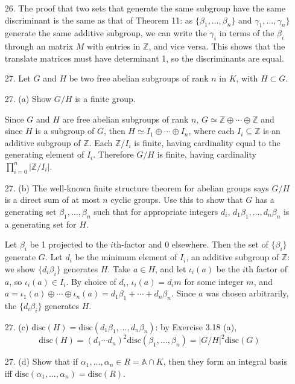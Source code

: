 \documentclass{article}
\newcommand{\Z}[0]{\mathbb{Z}}
\newcommand{\disc}[1]{\text{disc}(#1)}
\newcommand{\ringofintegers}[1]{\mathbb{A} \cap #1}
\begin{document}
\begin{enumerate}
\item[26.] The proof that two sets that generate the same subgroup have the same discriminant is the same as that of Theorem 11: as $\{\beta_1, \ldots, \beta_n\}$ and $\gamma_1, \ldots, \gamma_n\}$ generate the same additive subgroup, we can write the $\gamma_i$ in terms of the $\beta_i$ through an matrix $M$ with entries in $\Z$, and vice versa.  This shows that the translate matrices must have determinant 1, so the discriminants are equal.

\item[27.] Let $G$ and $H$ be two free abelian subgroups of rank $n$ in $K$, with $H \subset G$.
\item[27. (a)] Show $G / H$ is a finite group.

Since $G$ and $H$ are free abelian subgroups of rank $n$, $G \simeq \Z \oplus \cdots \oplus \Z$ and since $H$ is a subgroup of $G$, then $H \simeq I_1 \oplus \cdots \oplus I_n$, where each $I_i \subseteq \Z$ is an additive subgroup of $\Z$.  Each $\Z / I_i$ is finite, having cardinality equal to the generating element of $I_i$.  Therefore $G/H$ is finite, having cardinality $\prod_{i = 0}^{n} |\Z/I_i|$.

\item[27. (b)]  The well-known finite structure theorem for abelian groups says $G / H$ is a direct sum of at most $n$ cyclic groups.  Use this to show that $G$ has a generating set $\beta_1, \ldots, \beta_n$ such that for appropriate integers $d_i$, $d_1\beta_1, \ldots, d_n\beta_n$ is a generating set for $H$.

Let $\beta_i$ be 1 projected to the $i$th-factor and 0 elsewhere.  Then the set of $\{\beta_i\}$ generate $G$.  Let $d_i$ be the minimum element of $I_i$, an additive subgroup of $\Z$: we show $\{d_i\beta_i\}$ generates $H$.  Take $a \in H$, and let $\iota_i(a)$ be the $i$th factor of $a$, so $\iota_i(a) \in I_i$.  By choice of $d_i$, $\iota_i(a) = d_i m$ for some integer $m$, and $a = \iota_1(a) \oplus \cdots \oplus \iota_n(a) = d_1 \beta_1 + \cdots + d_n \beta_n$.  Since $a$ was chosen arbitrarily, the $\{d_i\beta_i\}$ generates $H$.

\item[27. (c)]  $\disc{H} = \disc{d_1\beta_1, \ldots, d_n\beta_n}$: by Exercise 3.18 (a), \[\disc{H} = (d_1 \cdots d_n)^2 \disc{\beta_1, \ldots, \beta_n} = |G/H|^2 \disc{G} \]

\item[27. (d)] Show that if $\alpha_1, \ldots, \alpha_n \in R = \ringofintegers{K}$, then they form an integral basis iff $\disc{\alpha_1, \ldots, \alpha_n} = \disc{R}$.


\end{enumerate}
\end{document}
